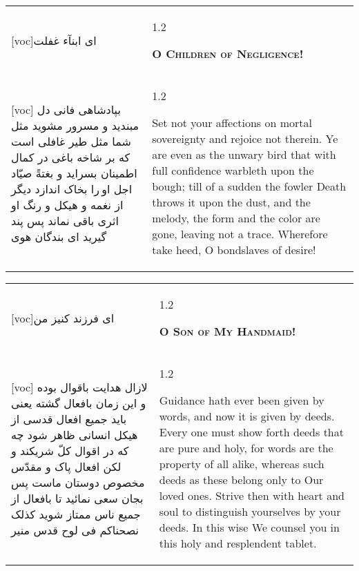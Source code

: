 \documentclass[11pt]{article}
\makeatletter
\newenvironment{orig}
  {\begin{farsi}[voc]}
  {\end{farsi}}
\newenvironment{trans}
  {\Large\begin{spacing}{1.2}\raggedright}
  {\end{spacing}}
\newenvironment{word}
  {\begin{tabular}[t]{p{2.75in}@{\hspace{3em}}p{2.75in}}}
  {\end{tabular}}
\newcommand{\ayat}[2]{\begin{orig}#1\end{orig} & \begin{trans}#2\end{trans}}
\newcommand{\heading}[2]{\textsc{\textbf{#1}} %
}
\makeatother
\begin{document}
\pagebreak

\begin{word}
\ayat{ای ابنآء غفلت}{\heading{O Children of Negligence!}{}} \\ \ayat{
بپادشاهی فانی دل مبنديد و مسرور مشويد
مثل شما مثل طير غافلی است که بر شاخه باغی در کمال اطمينان بسرايد و بغتةً صيّاد اجل او را بخاک اندازد ديگر از نغمه و هيکل و رنگ او اثری باقی نماند
پس پند گيريد ای بندگان هوی
}{
  Set not your affections on mortal sovereignty and rejoice not therein. Ye
  are even as the unwary bird that with full confidence warbleth upon the
  bough; till of a sudden the fowler Death throws it upon the dust, and the
  melody, the form and the color are gone, leaving not a trace. Wherefore take
  heed, O bondslaves of desire!
}
\end{word}

\pagebreak

\begin{word}
\ayat{ای فرزند کنيز من}{\heading{O Son of My Handmaid!}{}} \\ \ayat{
لازال هدايت باقوال بوده و اين زمان بافعال گشته
يعنی بايد جميع افعال قدسی از هيکل انسانی ظاهر شود چه که در اقوال کلّ شريکند و لکن افعال پاک و مقدّس مخصوص دوستان ماست
پس بجان سعی نمائيد تا بافعال از جميع ناس ممتاز شويد
کذلک نصحناکم فی لوح قدس منير
}{
  Guidance hath ever been given by words, and now it is given by deeds. Every
  one must show forth deeds that are pure and holy, for words are the property
  of all alike, whereas such deeds as these belong only to Our loved ones.
  Strive then with heart and soul to distinguish yourselves by your deeds. In
  this wise We counsel you in this holy and resplendent tablet.
}
\end{word}

\pagebreak
\end{document}
